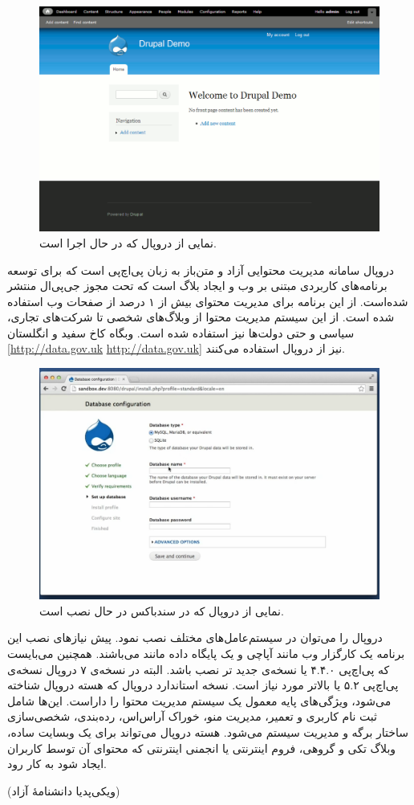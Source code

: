 \begin{figure}
    \includegraphics[width=.9\textwidth ,height=.50\textwidth]{Pic/DRUPAL2}
    \caption{ نمایی از دروپال که در حال اجرا است.
        \lr{}   
    }
    \label{DRUPAL-SANDBOX2}
\end{figure}
دروپال سامانه مدیریت محتوایی آزاد و متن‌باز به زبان پی‌اچ‌پی است که برای توسعه برنامه‌های کاربردی مبتنی بر وب و ایجاد بلاگ است که تحت مجوز جی‌پی‌ال منتشر شده‌است. از این برنامه برای مدیریت محتوای بیش از ۱ درصد از صفحات وب استفاده شده است. از این سیستم مدیریت محتوا از وبلاگ‌های شخصی تا شرکت‌های تجاری، سیاسی و حتی دولت‌ها نیز استفاده شده است. وبگاه کاخ سفید و  انگلستان 
[\url{http://data.gov.uk} \url{http://data.gov.uk}]
 نیز از دروپال استفاده می‌کنند.

\begin{figure}
    \includegraphics[width=.9\textwidth ,height=.50\textwidth]{Pic/DRUPAL}
    \caption{ نمایی از دروپال که در سندباکس در حال نصب است.
        \lr{}   
    }
    \label{DRUPAL-SANDBOX}
\end{figure}

دروپال را می‌توان در سیستم‌عامل‌های مختلف نصب نمود. پیش نیازهای نصب این برنامه یک کارگزار وب مانند آپاچی و یک پایگاه داده مانند 
 می‌باشند. همچنین می‌بایست که پی‌اچ‌پی ۴.۴.۰ یا نسخه‌ی جدید تر نصب باشد. البته در نسخه‌ی ۷ دروپال نسخه‌ی پی‌اچ‌پی ۵.۲ یا بالاتر مورد نیاز است.
نسخه استاندارد دروپال که هسته دروپال شناخته می‌شود، ویژگی‌های پایه معمول یک سیستم مدیریت محتوا را داراست. این‌ها شامل ثبت نام کاربری و تعمیر، مدیریت منو، خوراک آراس‌اس، رده‌بندی، شخصی‌سازی ساختار برگه و مدیریت سیستم می‌شود. هسته دروپال می‌تواند برای یک وبسایت ساده، وبلاگ تکی و گروهی، فروم اینترنتی یا انجمنی اینترنتی که محتوای آن توسط کاربران ایجاد شود به کار رود. 
\begin{flushleft}
    (ویکی‌پدیا دانشنامهٔ آزاد)
\end{flushleft}

